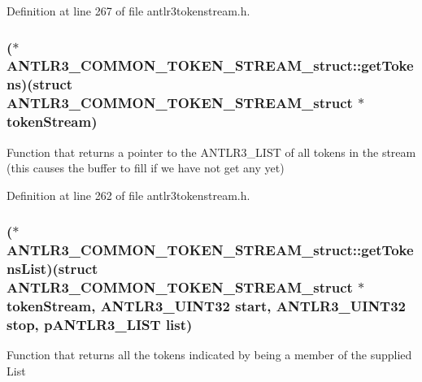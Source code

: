 Definition at line 267 of file antlr3tokenstream.\-h.

\hypertarget{struct_a_n_t_l_r3___c_o_m_m_o_n___t_o_k_e_n___s_t_r_e_a_m__struct_a1ac2d1d9b3b9d3bb80cac9f70c9d2df4}{
\subsubsection[{get\-Tokens}]{($\ast$ A\-N\-T\-L\-R3\-\_\-\-C\-O\-M\-M\-O\-N\-\_\-\-T\-O\-K\-E\-N\-\_\-\-S\-T\-R\-E\-A\-M\-\_\-struct\-::get\-Tokens)(struct {\bf A\-N\-T\-L\-R3\-\_\-\-C\-O\-M\-M\-O\-N\-\_\-\-T\-O\-K\-E\-N\-\_\-\-S\-T\-R\-E\-A\-M\-\_\-struct} $\ast$token\-Stream)}}\label{struct_a_n_t_l_r3___c_o_m_m_o_n___t_o_k_e_n___s_t_r_e_a_m__struct_a1ac2d1d9b3b9d3bb80cac9f70c9d2df4}
Function that returns a pointer to the A\-N\-T\-L\-R3\-\_\-\-L\-I\-S\-T of all tokens in the stream (this causes the buffer to fill if we have not get any yet) 

Definition at line 262 of file antlr3tokenstream.\-h.

\hypertarget{struct_a_n_t_l_r3___c_o_m_m_o_n___t_o_k_e_n___s_t_r_e_a_m__struct_a6aab126893e96d0e0ca8c36450e908de}{
\subsubsection[{get\-Tokens\-List}]{($\ast$ A\-N\-T\-L\-R3\-\_\-\-C\-O\-M\-M\-O\-N\-\_\-\-T\-O\-K\-E\-N\-\_\-\-S\-T\-R\-E\-A\-M\-\_\-struct\-::get\-Tokens\-List)(struct {\bf A\-N\-T\-L\-R3\-\_\-\-C\-O\-M\-M\-O\-N\-\_\-\-T\-O\-K\-E\-N\-\_\-\-S\-T\-R\-E\-A\-M\-\_\-struct} $\ast$token\-Stream, {\bf A\-N\-T\-L\-R3\-\_\-\-U\-I\-N\-T32} start, {\bf A\-N\-T\-L\-R3\-\_\-\-U\-I\-N\-T32} stop, {\bf p\-A\-N\-T\-L\-R3\-\_\-\-L\-I\-S\-T} list)}}\label{struct_a_n_t_l_r3___c_o_m_m_o_n___t_o_k_e_n___s_t_r_e_a_m__struct_a6aab126893e96d0e0ca8c36450e908de}
Function that returns all the tokens indicated by being a member of the supplied List 


